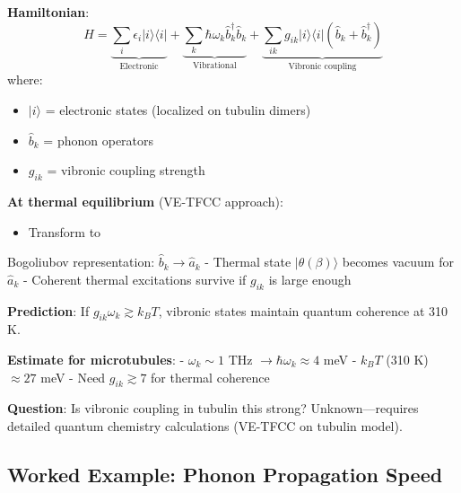 \textbf{Hamiltonian}:
\begin{equation}
\label{eq:vibronic-hamiltonian}
\hat{H} = \underbrace{\sum_i \epsilon_i | i \rangle \langle i |}_{\text{Electronic}} + \underbrace{\sum_k \hbar \omega_k \hat{b}_k^\dagger \hat{b}_k}_{\text{Vibrational}} + \underbrace{\sum_{ik} g_{ik} | i \rangle \langle i | (\hat{b}_k + \hat{b}_k^\dagger)}_{\text{Vibronic coupling}}
\end{equation}
where:
\begin{itemize}
\item $| i \rangle$ = electronic states (localized on tubulin dimers)
\item $\hat{b}_k$ = phonon operators
\item $g_{ik}$ = vibronic coupling strength
\end{itemize}

\textbf{At thermal equilibrium} (VE-TFCC approach):
\begin{itemize}
\item Transform to
\end{itemize}

Bogoliubov representation: \(\hat{b}_k \rightarrow \hat{a}_k\) - Thermal
state \(|\theta(\beta)\rangle\) becomes vacuum for \(\hat{a}_k\) -
Coherent thermal excitations survive if \(g_{ik}\) is large enough

\textbf{Prediction}: If \(g_{ik} \omega_k \gtrsim k_B T\), vibronic
states maintain quantum coherence at 310 K.

\textbf{Estimate for microtubules}: - \(\omega_k \sim 1\) THz
\(\rightarrow \hbar \omega_k \approx 4\) meV - \(k_B T\) (310 K)
\(\approx 27\) meV - Need \(g_{ik} \gtrsim 7\) for thermal coherence

\textbf{Question}: Is vibronic coupling in tubulin this strong?
Unknown---requires detailed quantum chemistry calculations (VE-TFCC
on tubulin model).


\subsection{Worked Example: Phonon Propagation Speed}
\label{subsec:worked-example}

